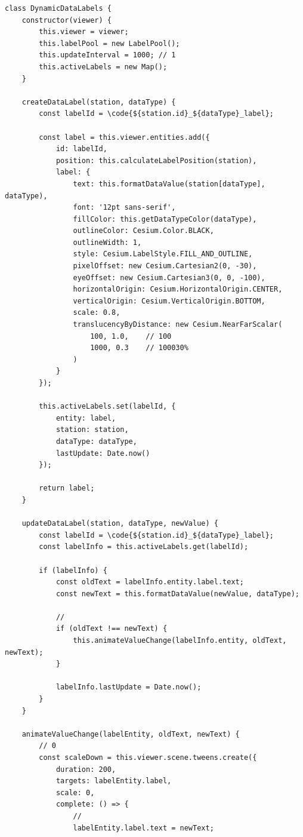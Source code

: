 \begin{lstlisting}[style=javascript]
class DynamicDataLabels {
    constructor(viewer) {
        this.viewer = viewer;
        this.labelPool = new LabelPool();
        this.updateInterval = 1000; // 1
        this.activeLabels = new Map();
    }
    
    createDataLabel(station, dataType) {
        const labelId = \code{${station.id}_${dataType}_label};
        
        const label = this.viewer.entities.add({
            id: labelId,
            position: this.calculateLabelPosition(station),
            label: {
                text: this.formatDataValue(station[dataType], dataType),
                font: '12pt sans-serif',
                fillColor: this.getDataTypeColor(dataType),
                outlineColor: Cesium.Color.BLACK,
                outlineWidth: 1,
                style: Cesium.LabelStyle.FILL_AND_OUTLINE,
                pixelOffset: new Cesium.Cartesian2(0, -30),
                eyeOffset: new Cesium.Cartesian3(0, 0, -100),
                horizontalOrigin: Cesium.HorizontalOrigin.CENTER,
                verticalOrigin: Cesium.VerticalOrigin.BOTTOM,
                scale: 0.8,
                translucencyByDistance: new Cesium.NearFarScalar(
                    100, 1.0,    // 100
                    1000, 0.3    // 100030%
                )
            }
        });
        
        this.activeLabels.set(labelId, {
            entity: label,
            station: station,
            dataType: dataType,
            lastUpdate: Date.now()
        });
        
        return label;
    }
    
    updateDataLabel(station, dataType, newValue) {
        const labelId = \code{${station.id}_${dataType}_label};
        const labelInfo = this.activeLabels.get(labelId);
        
        if (labelInfo) {
            const oldText = labelInfo.entity.label.text;
            const newText = this.formatDataValue(newValue, dataType);
            
            // 
            if (oldText !== newText) {
                this.animateValueChange(labelInfo.entity, oldText, newText);
            }
            
            labelInfo.lastUpdate = Date.now();
        }
    }
    
    animateValueChange(labelEntity, oldText, newText) {
        // 0
        const scaleDown = this.viewer.scene.tweens.create({
            duration: 200,
            targets: labelEntity.label,
            scale: 0,
            complete: () => {
                // 
                labelEntity.label.text = newText;
                

\end{lstlisting}
